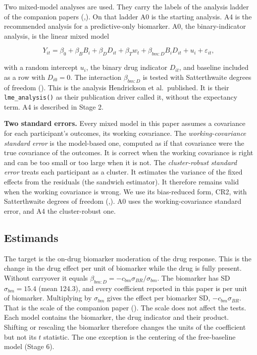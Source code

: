 \documentclass[
  11pt,
]{article}
\begin{document}
Two mixed-model analyses are used. They carry the labels of the
analysis ladder of the companion papers (,). On that ladder A0 is the starting analysis. A4
is the recommended analysis for a predictive-only biomarker. A0, the
binary-indicator analysis, is the linear mixed model

\[Y_{it} = \beta_0 + \beta_B B_i + \beta_D D_{it} + \beta_T w_t
  + \beta_{bm:D} B_i D_{it} + u_i + \varepsilon_{it},\]

with a random intercept \(u_i\), the binary drug indicator \(D_{it}\), and
baseline included as a row with \(D_{i0} = 0\). The interaction
\(\beta_{bm:D}\) is tested with Satterthwaite degrees of freedom
(). This is the analysis Hendrickson et al.~published.
It is their \texttt{lme\_analysis()} as their publication driver called it,
without the expectancy term. A4 is described in Stage 2.

\textbf{Two standard errors.} Every mixed model in this paper assumes a
covariance for each participant's outcomes, its working covariance. The
\emph{working-covariance standard error} is the model-based one, computed as
if that covariance were the true covariance of the outcomes. It is
correct when the working covariance is right and can be too small or
too large when it is not. The \emph{cluster-robust standard error} treats
each participant as a cluster. It estimates the variance of the fixed
effects from the residuals (the sandwich estimator). It therefore
remains valid when the working covariance is wrong. We use its
bias-reduced form, CR2, with Satterthwaite degrees of freedom
(,). A0 uses the working-covariance
standard error, and A4 the cluster-robust one.

\subsection{Estimands}\label{estimands}

The target is the on-drug biomarker moderation of the drug response.
This is the change in the drug effect per unit of biomarker while the
drug is fully present. Without carryover it equals
\(\beta_{bm:D} = -c_{bm}\sigma_{BR}/\sigma_{bm}\).
The biomarker has SD \(\sigma_{bm} = 15.4\) (mean 124.3), and every
coefficient reported in this paper is per unit of biomarker.
Multiplying by \(\sigma_{bm}\) gives the effect per biomarker SD,
\(-c_{bm}\sigma_{BR}\). That is the scale of the companion paper
(). The scale does not affect the tests. Each model
contains the biomarker, the drug indicator and their product. Shifting
or rescaling the biomarker therefore changes the units of the
coefficient but not its \(t\) statistic. The one exception is the
centering of the free-baseline model (Stage 6).
\end{document}
